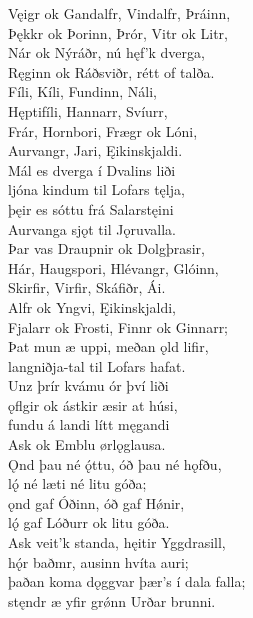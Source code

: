\bva Vęigr ok Gandalfr, \hld Vindalfr, Þráinn, \\%
Þękkr ok Þorinn, \hld Þrór, Vitr ok Litr, \\%
Nár ok Nýráðr, \hld nú hęf'k dverga, \\%
Ręginn ok Ráðsviðr, \hld rétt of talða.\\%

\bva Fíli, Kíli, \hld Fundinn, Náli, \\%
Hęptifíli, \hld Hannarr, Svíurr, \\%
Frár, Hornbori, \hld Frægr ok Lóni, \\%
Aurvangr, Jari, \hld Ęikinskjaldi.\\%

\bva Mál es dverga \hld í Dvalins liði \\%
ljóna kindum \hld til Lofars tęlja, \\%
þęir es sóttu \hld frá Salarstęini \\%
Aurvanga sjǫt \hld til Jǫruvalla.\\%

\bva Þar vas Draupnir \hld ok Dolgþrasir, \\%
Hár, Haugspori, \hld Hlévangr, Glóinn, \\%
Skirfir, Virfir, \hld Skáfiðr, Ái.\\%

\bva Alfr ok Yngvi, \hld Ęikinskjaldi, \\%
Fjalarr ok Frosti, \hld Finnr ok Ginnarr; \\%
Þat mun æ uppi, \hld meðan ǫld lifir, \\%
langniðja-tal \hld til Lofars hafat.\\%

\bva Unz þrír kvámu \hld ór því liði \\%
ǫflgir ok ástkir \hld æsir at húsi, \\%
fundu á landi \hld lítt męgandi \\%
Ask ok Emblu \hld ørlǫglausa.\\%

\bva Ǫnd þau né ǫ́ttu, \hld óð þau né hǫfðu, \\%
lǫ́ né læti \hld né litu góða; \\%
ǫnd gaf Óðinn, \hld óð gaf Hǿnir, \\%
lǫ́ gaf Lóðurr \hld ok litu góða.\\%

\bva Ask veit'k standa, \hld hęitir Yggdrasill, \\%
hǫ́r baðmr, ausinn \hld hvíta auri; \\%
þaðan koma dǫggvar \hld þær's í dala falla; \\%
stęndr æ yfir grǿnn \hld Urðar brunni.\\%

